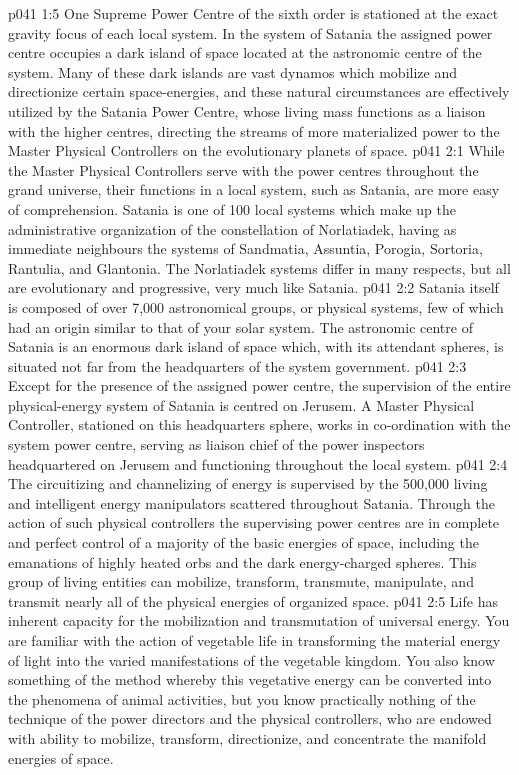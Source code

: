 \vs p041 1:5 One Supreme Power Centre of the sixth order is stationed at the exact gravity focus of each local system. In the system of Satania the assigned power centre occupies a dark island of space located at the astronomic centre of the system. Many of these dark islands are vast dynamos which mobilize and directionize certain space\hyp{}energies, and these natural circumstances are effectively utilized by the Satania Power Centre, whose living mass functions as a liaison with the higher centres, directing the streams of more materialized power to the Master Physical Controllers on the evolutionary planets of space.
\vs p041 2:1 While the Master Physical Controllers serve with the power centres throughout the grand universe, their functions in a local system, such as Satania, are more easy of comprehension. Satania is one of 100 local systems which make up the administrative organization of the constellation of Norlatiadek, having as immediate neighbours the systems of Sandmatia, Assuntia, Porogia, Sortoria, Rantulia, and Glantonia. The Norlatiadek systems differ in many respects, but all are evolutionary and progressive, very much like Satania.
\vs p041 2:2 Satania itself is composed of over 7,000 astronomical groups, or physical systems, few of which had an origin similar to that of your solar system. The astronomic centre of Satania is an enormous dark island of space which, with its attendant spheres, is situated not far from the headquarters of the system government.
\vs p041 2:3 \pc Except for the presence of the assigned power centre, the supervision of the entire physical\hyp{}energy system of Satania is centred on Jerusem. A Master Physical Controller, stationed on this headquarters sphere, works in co\hyp{}ordination with the system power centre, serving as liaison chief of the power inspectors headquartered on Jerusem and functioning throughout the local system.
\vs p041 2:4 The circuitizing and channelizing of energy is supervised by the 500,000 living and intelligent energy manipulators scattered throughout Satania. Through the action of such physical controllers the supervising power centres are in complete and perfect control of a majority of the basic energies of space, including the emanations of highly heated orbs and the dark energy\hyp{}charged spheres. This group of living entities can mobilize, transform, transmute, manipulate, and transmit nearly all of the physical energies of organized space.
\vs p041 2:5 Life has inherent capacity for the mobilization and transmutation of universal energy. You are familiar with the action of vegetable life in transforming the material energy of light into the varied manifestations of the vegetable kingdom. You also know something of the method whereby this vegetative energy can be converted into the phenomena of animal activities, but you know practically nothing of the technique of the power directors and the physical controllers, who are endowed with ability to mobilize, transform, directionize, and concentrate the manifold energies of space.
